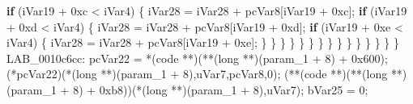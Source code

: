 \documentclass[
]{article}
\newenvironment{Shaded}{}{}
\newcommand{\BaseNTok}[1]{\textcolor[rgb]{0.25,0.63,0.44}{#1}}
\newcommand{\ControlFlowTok}[1]{\textcolor[rgb]{0.00,0.44,0.13}{\textbf{#1}}}
\newcommand{\DataTypeTok}[1]{\textcolor[rgb]{0.56,0.13,0.00}{#1}}
\newcommand{\DecValTok}[1]{\textcolor[rgb]{0.25,0.63,0.44}{#1}}
\newcommand{\NormalTok}[1]{#1}
\newcommand{\OperatorTok}[1]{\textcolor[rgb]{0.40,0.40,0.40}{#1}}
\begin{document}
\begin{Shaded}
\begin{Highlighting}[]
                          \ControlFlowTok{if} \OperatorTok{(}\NormalTok{iVar19 }\OperatorTok{+} \BaseNTok{0xc} \OperatorTok{\textless{}}\NormalTok{ iVar4}\OperatorTok{)} \OperatorTok{\{}
\NormalTok{                            iVar28 }\OperatorTok{=}\NormalTok{ iVar28 }\OperatorTok{+}\NormalTok{ pcVar8}\OperatorTok{[}\NormalTok{iVar19 }\OperatorTok{+} \BaseNTok{0xc}\OperatorTok{];}
                            \ControlFlowTok{if} \OperatorTok{(}\NormalTok{iVar19 }\OperatorTok{+} \BaseNTok{0xd} \OperatorTok{\textless{}}\NormalTok{ iVar4}\OperatorTok{)} \OperatorTok{\{}
\NormalTok{                              iVar28 }\OperatorTok{=}\NormalTok{ iVar28 }\OperatorTok{+}\NormalTok{ pcVar8}\OperatorTok{[}\NormalTok{iVar19 }\OperatorTok{+} \BaseNTok{0xd}\OperatorTok{];}
                              \ControlFlowTok{if} \OperatorTok{(}\NormalTok{iVar19 }\OperatorTok{+} \BaseNTok{0xe} \OperatorTok{\textless{}}\NormalTok{ iVar4}\OperatorTok{)} \OperatorTok{\{}
\NormalTok{                                iVar28 }\OperatorTok{=}\NormalTok{ iVar28 }\OperatorTok{+}\NormalTok{ pcVar8}\OperatorTok{[}\NormalTok{iVar19 }\OperatorTok{+} \BaseNTok{0xe}\OperatorTok{];}
                              \OperatorTok{\}}
                            \OperatorTok{\}}
                          \OperatorTok{\}}
                        \OperatorTok{\}}
                      \OperatorTok{\}}
                    \OperatorTok{\}}
                  \OperatorTok{\}}
                \OperatorTok{\}}
              \OperatorTok{\}}
            \OperatorTok{\}}
          \OperatorTok{\}}
        \OperatorTok{\}}
      \OperatorTok{\}}
    \OperatorTok{\}}
  \OperatorTok{\}}
\NormalTok{LAB\_0010c6cc}\OperatorTok{:}
\NormalTok{  pcVar22 }\OperatorTok{=} \OperatorTok{*(}\NormalTok{code }\OperatorTok{**)(**(}\DataTypeTok{long} \OperatorTok{**)(}\NormalTok{param\_1 }\OperatorTok{+} \DecValTok{8}\OperatorTok{)} \OperatorTok{+} \BaseNTok{0x600}\OperatorTok{);}
  \OperatorTok{(*}\NormalTok{pcVar22}\OperatorTok{)(*(}\DataTypeTok{long} \OperatorTok{**)(}\NormalTok{param\_1 }\OperatorTok{+} \DecValTok{8}\OperatorTok{),}\NormalTok{uVar7}\OperatorTok{,}\NormalTok{pcVar8}\OperatorTok{,}\DecValTok{0}\OperatorTok{);}
  \OperatorTok{(**(}\NormalTok{code }\OperatorTok{**)(**(}\DataTypeTok{long} \OperatorTok{**)(}\NormalTok{param\_1 }\OperatorTok{+} \DecValTok{8}\OperatorTok{)} \OperatorTok{+} \BaseNTok{0xb8}\OperatorTok{))(*(}\DataTypeTok{long} \OperatorTok{**)(}\NormalTok{param\_1 }\OperatorTok{+} \DecValTok{8}\OperatorTok{),}\NormalTok{uVar7}\OperatorTok{);}
\NormalTok{  bVar25 }\OperatorTok{=} \DecValTok{0}\OperatorTok{;}

\end{Highlighting}
\end{Shaded}
\end{document}
